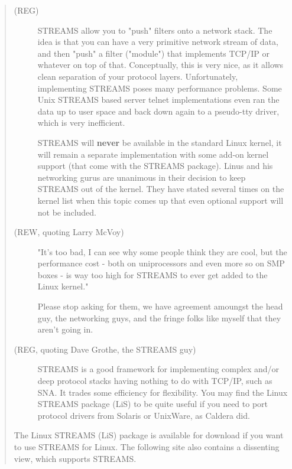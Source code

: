 \documentclass[letterpaper,final,notitlepage,twocolumn,10pt,twoside]{article}
\begin{document}
\footnotesize
\begin{quote}

\begin{description}

\item[(REG)] STREAMS allow you to "push" filters onto a network stack.  The idea is that you can
have a very primitive network stream of data, and then "push" a filter ("module") that implements
TCP/IP or whatever on top of that.  Conceptually, this is very nice, as it allows clean separation
of your protocol layers.  Unfortunately, implementing STREAMS poses many performance problems.  Some
Unix STREAMS based server telnet implementations even ran the data up to user space and back down
again to a pseudo-tty driver, which is very inefficient.

STREAMS will \textbf{never} be available in the standard Linux kernel, it will remain a separate
implementation with some add-on kernel support (that come with the STREAMS package).  Linus and his
networking gurus are unanimous in their decision to keep STREAMS out of the kernel.  They have
stated several times on the kernel list when this topic comes up that even optional support will not
be included.

\item[(REW, quoting Larry McVoy)] "It's too bad, I can see why some people think they are cool, but
the performance cost - both on uniprocessors and even more so on SMP boxes - is way too high for
STREAMS to ever get added to the Linux kernel."

Please stop asking for them, we have agreement amoungst the head guy, the networking guys, and the
fringe folks like myself that they aren't going in.

\item[(REG, quoting Dave Grothe, the STREAMS guy)] STREAMS is a good framework for implementing
complex and/or deep protocol stacks having nothing to do with TCP/IP, such as SNA.  It trades some
efficiency for flexibility.  You may find the Linux STREAMS package (LiS) to be quite useful if you
need to port protocol drivers from Solaris or UnixWare, as Caldera did.

\end{description}

The Linux STREAMS (LiS) package is available for download if you want to use STREAMS for Linux.  The
following site also contains a dissenting view, which supports STREAMS.

\end{quote}
\normalsize
\end{document}
